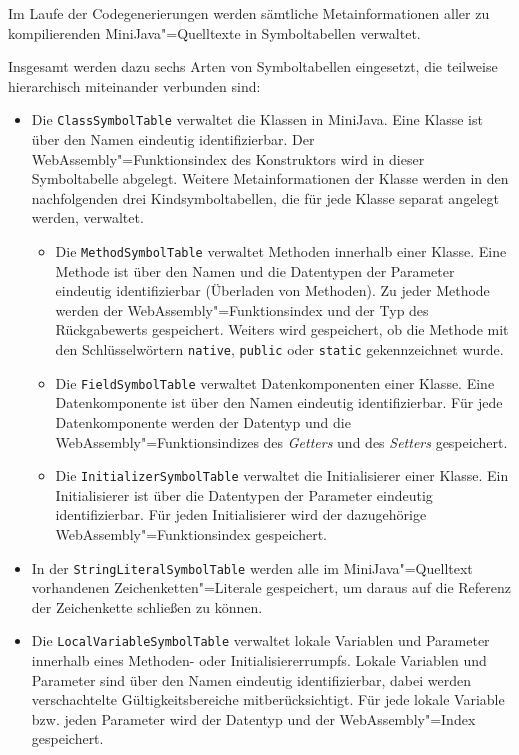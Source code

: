 Im Laufe der Codegenerierungen werden sämtliche Metainformationen aller zu kompilierenden MiniJava"=Quelltexte in Symboltabellen verwaltet.

Insgesamt werden dazu sechs Arten von Symboltabellen eingesetzt, die teilweise hierarchisch miteinander verbunden sind:
\begin{itemize}
    \item Die \lstinline{ClassSymbolTable} verwaltet die Klassen in MiniJava. Eine Klasse ist über den Namen eindeutig identifizierbar. Der WebAssembly"=Funktionsindex des Konstruktors wird in dieser Symboltabelle abgelegt. Weitere Metainformationen der Klasse werden in den nachfolgenden drei Kindsymboltabellen, die für jede Klasse separat angelegt werden, verwaltet.
    \begin{itemize}
        \item Die \lstinline{MethodSymbolTable} verwaltet Methoden innerhalb einer Klasse. Eine Methode ist über den Namen und die Datentypen der Parameter eindeutig identifizierbar (Überladen von Methoden). Zu jeder Methode werden der WebAssembly"=Funktionsindex und der Typ des Rückgabewerts gespeichert. Weiters wird gespeichert, ob die Methode mit den Schlüsselwörtern \lstinline{native}, \lstinline{public} oder \lstinline{static}  gekennzeichnet wurde.
        \item Die \lstinline{FieldSymbolTable} verwaltet Datenkomponenten einer Klasse. Eine Datenkomponente ist über den Namen eindeutig identifizierbar. Für jede Datenkomponente werden der Datentyp und die WebAssembly"=Funktionsindizes des \emph{Getters} und des \emph{Setters} gespeichert.
        \item Die \lstinline{InitializerSymbolTable} verwaltet die Initialisierer einer Klasse. Ein Initialisierer ist über die Datentypen der Parameter eindeutig identifizierbar. Für jeden Initialisierer wird der dazugehörige WebAssembly"=Funktionsindex gespeichert.
    \end{itemize}
    \item In der \lstinline{StringLiteralSymbolTable} werden alle im MiniJava"=Quelltext vorhandenen Zeichenketten"=Literale gespeichert, um daraus auf die Referenz der Zeichenkette schließen zu können.
    \item Die \lstinline{LocalVariableSymbolTable} verwaltet lokale Variablen und Parameter innerhalb eines Methoden- oder Initialisiererrumpfs. Lokale Variablen und Parameter sind über den Namen eindeutig identifizierbar, dabei werden verschachtelte Gültigkeitsbereiche mitberücksichtigt. Für jede lokale Variable bzw. jeden Parameter wird der Datentyp und der WebAssembly"=Index gespeichert.
\end{itemize}

